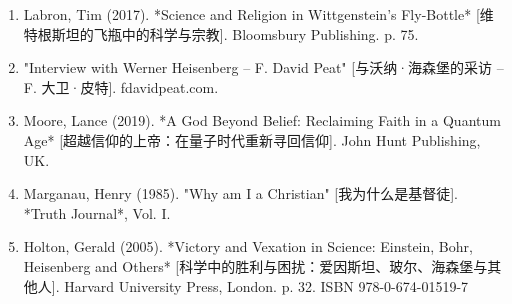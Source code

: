 \begin{enumerate}
\item Labron, Tim (2017). *Science and Religion in Wittgenstein's Fly-Bottle* [维特根斯坦的飞瓶中的科学与宗教]. Bloomsbury Publishing. p. 75.  
\item "Interview with Werner Heisenberg – F. David Peat" [与沃纳·海森堡的采访 – F. 大卫·皮特]. fdavidpeat.com.  
\item Moore, Lance (2019). *A God Beyond Belief: Reclaiming Faith in a Quantum Age* [超越信仰的上帝：在量子时代重新寻回信仰]. John Hunt Publishing, UK.  
\item Marganau, Henry (1985). "Why am I a Christian" [我为什么是基督徒]. *Truth Journal*, Vol. I.  
\item Holton, Gerald (2005). *Victory and Vexation in Science: Einstein, Bohr, Heisenberg and Others* [科学中的胜利与困扰：爱因斯坦、玻尔、海森堡与其他人]. Harvard University Press, London. p. 32. ISBN 978-0-674-01519-7
\end{enumerate}